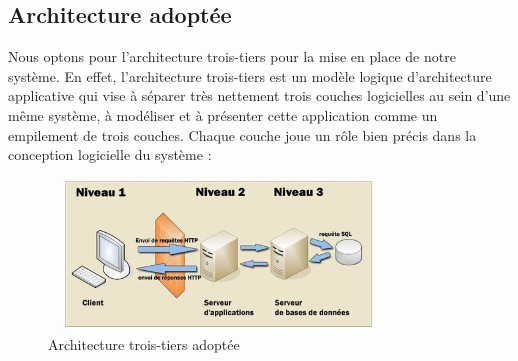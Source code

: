 \subsection{Architecture adoptée}
Nous optons pour l’architecture trois-tiers pour la mise en place de notre système. En effet, l’architecture trois-tiers est un modèle logique d’architecture applicative qui vise à séparer très nettement trois couches logicielles au sein d’une même système, à modéliser et à présenter cette application comme un empilement de trois couches. Chaque couche joue un rôle bien précis dans la conception logicielle du système :
\begin{figure}[!h]
\begin{center}
\includegraphics[width=9cm,height=4cm]{Conception/3-tiers.jpeg}
\end{center}
\caption{Architecture trois-tiers adoptée}
\end{figure}

